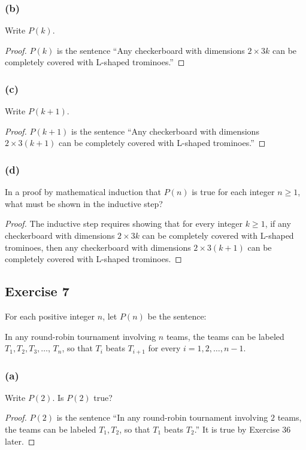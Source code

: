\documentclass[14pt]{extarticle}
\begin{document}
\subsubsection{(b)}
Write $P(k)$.

\begin{proof}
$P(k)$ is the sentence “Any checkerboard with dimensions $2 \times 3k$ can be completely covered with L-shaped trominoes.”

\end{proof}

\subsubsection{(c)}
Write $P(k + 1)$.

\begin{proof}
$P(k + 1)$ is the sentence “Any checkerboard with dimensions $2 \times 3(k + 1)$ can be completely covered with L-shaped trominoes.”
\end{proof}

\subsubsection{(d)}
In a proof by mathematical induction that $P(n)$ is true for each integer $n \geq 1$, what must be shown in the inductive step?

\begin{proof}
The inductive step requires showing that for every integer $k \geq 1$, if any checkerboard with dimensions $2 \times 3k$ can be completely covered with L-shaped trominoes, then any checkerboard with dimensions $2 \times 3(k + 1)$ can be completely covered with L-shaped trominoes.
\end{proof}

\subsection{Exercise 7}
For each positive integer $n$, let $P(n)$ be the sentence:

In any round-robin tournament involving $n$ teams, the teams can be labeled $T_1, T_2, T_3, \ldots$, $T_n$, so that $T_i$ beats $T_{i + 1}$ for every $i = 1, 2, \ldots, n - 1$.

\subsubsection{(a)}
Write $P(2)$. Is $P(2)$ true?

\begin{proof}
$P(2)$ is the sentence ``In any round-robin tournament involving $2$ teams, the teams can be labeled $T_1, T_2$, so that $T_1$ beats $T_{2}$.'' It is true by Exercise 36 later.
\end{proof}
\end{document}
